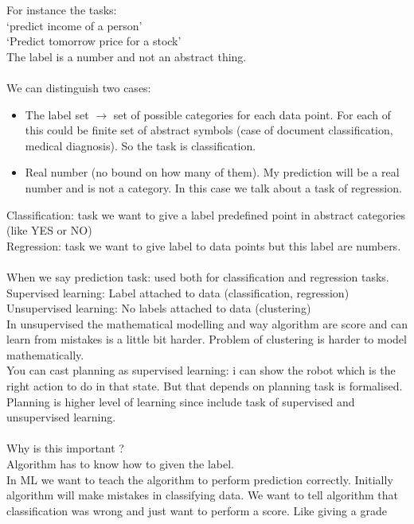 \documentclass[../main.tex]{subfiles}
\begin{document}
For instance the tasks:\\
‘predict income of a person’\\
‘Predict tomorrow price for a stock’\\
The label is a number and not an abstract thing.\\\\
We can distinguish two cases:
\begin{itemize}
\item The label set $\rightarrow$ set of possible categories for each data point. For each of
this could be finite set of abstract symbols (case of document classification,
medical diagnosis). So the task is classification.
\item Real number (no bound on how many of them). My prediction will be a real
number and is not a category. In this case we talk about a task of
regression.
\end{itemize}
Classification: task we want to give a label predefined point in abstract
categories (like YES or NO)
\\
Regression: task we want to give label to data points but this label are
numbers.\\\\
When we say prediction task: used both for classification and regression
tasks.\\
Supervised learning: Label attached to data (classification, regression)\\
Unsupervised learning: No labels attached to data (clustering)\\
In unsupervised the mathematical modelling and way algorithm are score and
can learn from mistakes is a little bit harder. Problem of clustering is harder to
model mathematically.\\
You can cast planning as supervised learning: i can show the robot which is
the right action to do in that state. But that depends on planning task is
formalised.\\
Planning is higher level of learning since include task of supervised and
unsupervised learning.\\\\
Why is this important ?\\
Algorithm has to know how to given the label.\\
In ML we want to teach the algorithm to perform prediction correctly. Initially
algorithm will make mistakes in classifying data. We want to tell algorithm that
classification was wrong and just want to perform a score. Like giving a grade
\end{document}
